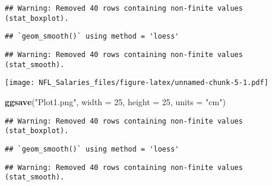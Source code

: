\documentclass[]{article}
\newenvironment{Shaded}{\begin{snugshade}}{\end{snugshade}}
\newcommand{\KeywordTok}[1]{\textcolor[rgb]{0.13,0.29,0.53}{\textbf{#1}}}
\newcommand{\DataTypeTok}[1]{\textcolor[rgb]{0.13,0.29,0.53}{#1}}
\newcommand{\DecValTok}[1]{\textcolor[rgb]{0.00,0.00,0.81}{#1}}
\newcommand{\FloatTok}[1]{\textcolor[rgb]{0.00,0.00,0.81}{#1}}
\newcommand{\StringTok}[1]{\textcolor[rgb]{0.31,0.60,0.02}{#1}}
\newcommand{\OperatorTok}[1]{\textcolor[rgb]{0.81,0.36,0.00}{\textbf{#1}}}
\newcommand{\NormalTok}[1]{#1}
\begin{document}
\begin{Shaded}
\end{Shaded}

\begin{verbatim}
## Warning: Removed 40 rows containing non-finite values (stat_boxplot).
\end{verbatim}

\begin{verbatim}
## `geom_smooth()` using method = 'loess'
\end{verbatim}

\begin{verbatim}
## Warning: Removed 40 rows containing non-finite values (stat_smooth).
\end{verbatim}

\texttt{[image: NFL\_Salaries\_files/figure-latex/unnamed-chunk-5-1.pdf]}

\begin{Shaded}
\begin{Highlighting}[]
\KeywordTok{ggsave}\NormalTok{(}\StringTok{"Plot1.png"}\NormalTok{, }\DataTypeTok{width =} \DecValTok{25}\NormalTok{, }\DataTypeTok{height =} \DecValTok{25}\NormalTok{, }\DataTypeTok{units =} \StringTok{"cm"}\NormalTok{)}
\end{Highlighting}
\end{Shaded}

\begin{verbatim}
## Warning: Removed 40 rows containing non-finite values (stat_boxplot).
\end{verbatim}

\begin{verbatim}
## `geom_smooth()` using method = 'loess'
\end{verbatim}

\begin{verbatim}
## Warning: Removed 40 rows containing non-finite values (stat_smooth).
\end{verbatim}
\end{document}

